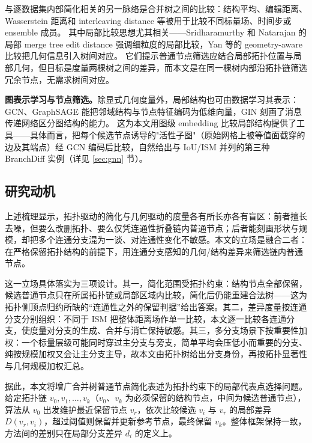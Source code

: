 \documentclass[twocolumn, a4paper, 10pt]{article}
\begin{document}
与逐数据集内部简化相关的另一脉络是合并树之间的比较：结构平均、编辑距离、Wasserstein 距离和 interleaving distance 等被用于比较不同标量场、时间步或 ensemble 成员。\cite{yan_average_2020,pont_wasserstein_2022,wetzels_branch_2022} 其中局部比较思想尤其相关——Sridharamurthy 和 Natarajan 的局部 merge tree edit distance 强调细粒度的局部比较，Yan 等的 geometry-aware 比较把几何信息引入树间对应。\cite{sridharamurthy_local_2023,yan_geometry_2023} 它们提示普通节点筛选应结合局部拓扑位置与局部几何，但目标是度量两棵树之间的差异，而本文是在同一棵树内部沿拓扑链筛选冗余节点，无需求树间对应。

\textbf{图表示学习与节点筛选。}除显式几何度量外，局部结构也可由数据学习其表示：GCN、GraphSAGE 能把邻域结构与节点特征编码为低维向量，GIN 刻画了消息传递网络区分图结构的能力。\cite{kipf_gcn_2017,hamilton_graphsage_2017,xu_gin_2019} 这为本文用图级 embedding 比较局部结构提供了工具——具体而言，把每个候选节点诱导的"活性子图"（原始网格上被等值面截穿的边及其端点）经 GCN 编码后比较，自然给出与 IoU/ISM 并列的第三种 BranchDiff 实例（详见 \ref{sec:gnn} 节）。

\subsection{研究动机}

上述梳理显示，拓扑驱动的简化与几何驱动的度量各有所长亦各有盲区：前者擅长去噪，但要么改删拓扑、要么仅凭连通性折叠链内普通节点；后者能刻画形状与规模，却把多个连通分支混为一谈、对连通性变化不敏感。本文的立场是融合二者：在严格保留拓扑结构的前提下，用连通分支感知的几何/结构差异来筛选链内普通节点。

这一立场具体落实为三项设计。其一，简化范围受拓扑约束：结构节点全部保留，候选普通节点只在所属拓扑链或局部区域内比较，简化后仍能重建合法树——这为拓扑侧顶点归约所缺的“连通性之外的保留判据”给出答案。其二，差异度量按连通分支分别组织：不同于 ISM 把整体距离场作单一比较，本文逐一比较各连通分支，使度量对分支的生成、合并与消亡保持敏感。其三，多分支场景下按重要性加权：一个标量层级可能同时穿过主分支与旁支，简单平均会压低小而重要的分支、纯按规模加权又会让主分支主导，故本文由拓扑树给出分支身份，再按拓扑显著性与几何规模加权汇总。

据此，本文将增广合并树普通节点简化表述为拓扑约束下的局部代表点选择问题。给定拓扑链 $v_0,v_1,\ldots,v_k$（$v_0$、$v_k$ 为必须保留的结构节点，中间为候选普通节点），算法从 $v_0$ 出发维护最近保留节点 $v_r$，依次比较候选 $v_i$ 与 $v_r$ 的局部差异 $D(v_r,v_i)$，超过阈值则保留并更新参考节点，最终保留 $v_k$。整体框架保持一致，方法间的差别只在局部分支差异 $d_i$ 的定义上。
\end{document}
